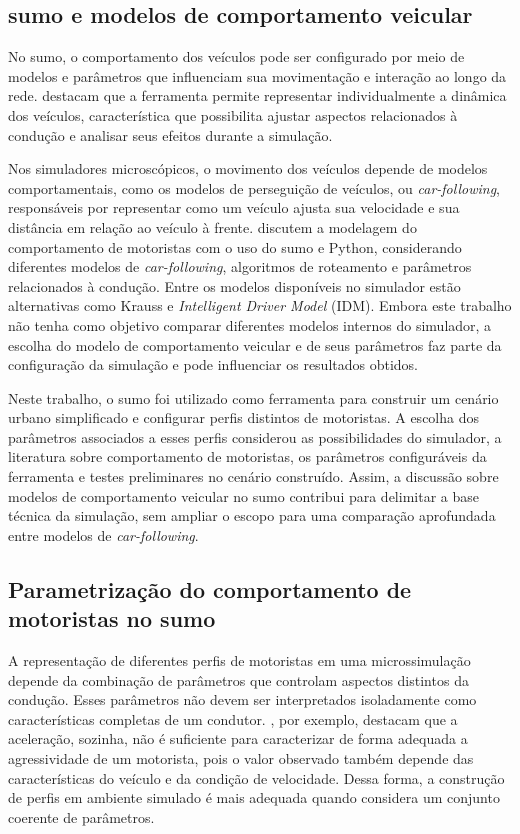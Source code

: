 \subsection{\gls{sumo} e modelos de comportamento veicular}

No \gls{sumo}, o comportamento dos veículos pode ser configurado por meio de modelos e parâmetros que influenciam sua movimentação e interação ao longo da rede.  destacam que a ferramenta permite representar individualmente a dinâmica dos veículos, característica que possibilita ajustar aspectos relacionados à condução e analisar seus efeitos durante a simulação.

Nos simuladores microscópicos, o movimento dos veículos depende de modelos comportamentais, como os modelos de perseguição de veículos, ou \textit{car-following}, responsáveis por representar como um veículo ajusta sua velocidade e sua distância em relação ao veículo à frente.  discutem a modelagem do comportamento de motoristas com o uso do \gls{sumo} e Python, considerando diferentes modelos de \textit{car-following}, algoritmos de roteamento e parâmetros relacionados à condução. Entre os modelos disponíveis no simulador estão alternativas como Krauss e \textit{Intelligent Driver Model} (IDM). Embora este trabalho não tenha como objetivo comparar diferentes modelos internos do simulador, a escolha do modelo de comportamento veicular e de seus parâmetros faz parte da configuração da simulação e pode influenciar os resultados obtidos.

Neste trabalho, o \gls{sumo} foi utilizado como ferramenta para construir um cenário urbano simplificado e configurar perfis distintos de motoristas. A escolha dos parâmetros associados a esses perfis considerou as possibilidades do simulador, a literatura sobre comportamento de motoristas, os parâmetros configuráveis da ferramenta e testes preliminares no cenário construído. Assim, a discussão sobre modelos de comportamento veicular no \gls{sumo} contribui para delimitar a base técnica da simulação, sem ampliar o escopo para uma comparação aprofundada entre modelos de \textit{car-following}.

\subsection{Parametrização do comportamento de motoristas no \gls{sumo}}

A representação de diferentes perfis de motoristas em uma microssimulação depende da combinação de parâmetros que controlam aspectos distintos da condução. Esses parâmetros não devem ser interpretados isoladamente como características completas de um condutor. , por exemplo, destacam que a aceleração, sozinha, não é suficiente para caracterizar de forma adequada a agressividade de um motorista, pois o valor observado também depende das características do veículo e da condição de velocidade. Dessa forma, a construção de perfis em ambiente simulado é mais adequada quando considera um conjunto coerente de parâmetros.

